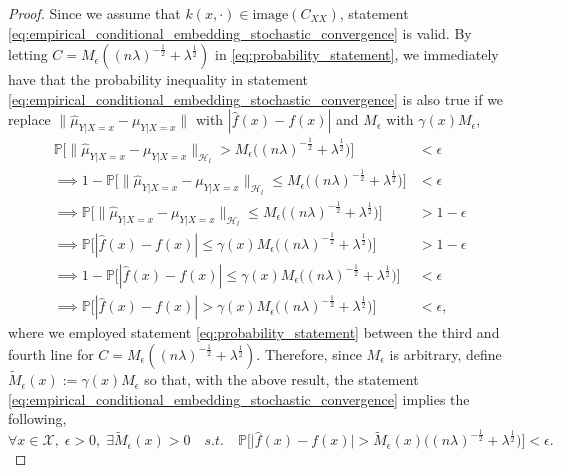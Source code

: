 \documentclass[runningheads, envcountsame, a4paper]{llncs}
\begin{document}
\begin{proof}
			Since we assume that $k(x, \cdot) \in \mathrm{image}(C_{XX})$, statement \eqref{eq:empirical_conditional_embedding_stochastic_convergence} is valid. By letting $C = M_{\epsilon} ((n \lambda)^{-\frac{1}{2}} + \lambda^{\frac{1}{2}})$ in \eqref{eq:probability_statement}, we immediately have that the probability inequality in statement \eqref{eq:empirical_conditional_embedding_stochastic_convergence} is also true if we replace $\| \hat{\mu}_{Y | X = x} - \mu_{Y | X = x} \|$ with $| \hat{f}(x) - f(x) |$ and $M_{\epsilon}$ with $\gamma(x) M_{\epsilon}$,	
			\begin{equation}
			\begin{aligned}
				\mathbb{P}\Big[\big\| \hat{\mu}_{Y | X = x} - \mu_{Y | X = x} \big\|_{\mathcal{H}_{l}} > M_{\epsilon} \Big((n \lambda)^{-\frac{1}{2}} + \lambda^{\frac{1}{2}}\Big)\Big] &< \epsilon \\
				\implies 1 - \mathbb{P}\Big[\big\| \hat{\mu}_{Y | X = x} - \mu_{Y | X = x} \big\|_{\mathcal{H}_{l}} \leq M_{\epsilon} \Big((n \lambda)^{-\frac{1}{2}} + \lambda^{\frac{1}{2}}\Big)\Big] &< \epsilon \\
				\implies \mathbb{P}\Big[\big\| \hat{\mu}_{Y | X = x} - \mu_{Y | X = x} \big\|_{\mathcal{H}_{l}} \leq M_{\epsilon} \Big((n \lambda)^{-\frac{1}{2}} + \lambda^{\frac{1}{2}}\Big)\Big] &> 1 -  \epsilon \\
				\implies \mathbb{P}\Big[| \hat{f}(x) - f(x) | \leq \gamma(x) M_{\epsilon} \Big((n \lambda)^{-\frac{1}{2}} + \lambda^{\frac{1}{2}}\Big)\Big] &> 1 -  \epsilon \\
				\implies 1 - \mathbb{P}\Big[| \hat{f}(x) - f(x) | \leq \gamma(x) M_{\epsilon} \Big((n \lambda)^{-\frac{1}{2}} + \lambda^{\frac{1}{2}}\Big)\Big] &< \epsilon \\
				\implies \mathbb{P}\Big[| \hat{f}(x) - f(x) | > \gamma(x) M_{\epsilon} \Big((n \lambda)^{-\frac{1}{2}} + \lambda^{\frac{1}{2}}\Big)\Big] &< \epsilon,
			\end{aligned}	
			\end{equation}
			where we employed statement \eqref{eq:probability_statement} between the third and fourth line for $C = M_{\epsilon} ((n \lambda)^{-\frac{1}{2}} + \lambda^{\frac{1}{2}})$. Therefore, since $M_{\epsilon}$ is arbitrary, define $\tilde{M}_{\epsilon}(x) := \gamma(x) M_{\epsilon}$ so that, with the above result, the statement \eqref{eq:empirical_conditional_embedding_stochastic_convergence} implies the following,
			\begin{equation}
				\forall x \in \mathcal{X}, \; \epsilon > 0, \; \exists \tilde{M}_{\epsilon}(x) > 0 \quad s.t. \quad \mathbb{P}\Big[\big| \hat{f}(x) - f(x) \big| > \tilde{M}_{\epsilon}(x) \Big((n \lambda)^{-\frac{1}{2}} + \lambda^{\frac{1}{2}}\Big)\Big] < \epsilon.
			\end{equation}
			

\end{proof}
\end{document}
